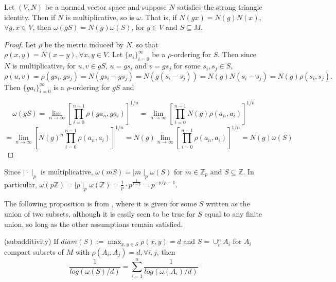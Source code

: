 \begin{proposition}
	Let $(V, N)$ be a normed vector space and suppose $N$ satisfies the strong triangle identity. Then if $N$ is multiplicative, so is $\omega$. That is, if $N(gx)=N(g)N(x)$,$\forall g,x \in V$, then $\omega(gS) = N(g)  \omega(S)$, for $g \in V$ and $S \subseteq M$. 
\end{proposition}

\begin{proof}
	Let $\rho$ be the metric induced by $N$, so that $\rho(x,y) = N(x-y), \forall x,y \in V$. Let $\{a_i\}_{i=0}^\infty$ be a $\rho$-ordering for $S$. Then since $N$ is multiplicative, for $u, v \in gS$, $u=gs_i$ and $v=gs_j$ for some $s_i, s_j \in S$,  $$\rho(u, v) = \rho(gs_i, gs_j) =N(gs_i - gs_j) = N(g(s_i - s_j)) = N(g)N(s_i - s_j) = N(g)\rho(s_i,s_j).$$
	Then $\{ga_i\}_{i=0}^\infty$ is a $\rho$-ordering for $gS$ and 
	
	$$\omega(gS) = \lim_{n\to\infty} [\prod_{i=0}^{n-1} \rho(ga_n,ga_i)]^{1/n} 
	= \lim_{n\to\infty} [\prod_{i=0}^{n-1} N(g)\rho(a_n,a_i)]^{1/n} $$
	$$= \lim_{n\to\infty} [N(g)^n\prod_{i=0}^{n-1} \rho(a_n,a_i)]^{1/n} = N(g) \lim_{n\to\infty} [\prod_{i=0}^{n-1} \rho(a_n,a_i)]^{1/n} = N(g) \omega(S)$$
\end{proof}


\begin{example}
	Since $\mid \cdot \mid_p$ is multiplicative, $\omega(mS) = \mid m \mid_p  \omega(S)$ for $m \in \mathbb{Z}_p$ and $S \subseteq \mathbb{Z}$. In particular, $\omega(p\mathbb{Z}) = \mid p \mid_p \omega(\mathbb{Z}) = \frac{1}{p}\cdot p^{\frac{1}{1-p}} = p^{-p/p-1}.$
\end{example}

The following proposition is from \cite{kj}, where it is given for some $S$  written as the union of two subsets, although it is easily seen to be true for $S$ equal to any finite union, so long as the other assumptions remain satisfied.

\begin{proposition}
	\cite{kj}(subadditivity) If  $diam(S) := \max_{x,y \in S} \rho(x,y)=d$ and $S=\cup_i^n A_i$ for $A_i$ compact subsets of $M$ with $\rho(A_i, A_j)=d, \forall i,j$, then \[\frac{1}{log(\omega(S)/d) } = \sum_{i=1}^n \frac{1}{log(\omega(A_i)/d)}\] 
\end{proposition}


\begin{example}

\end{example}

